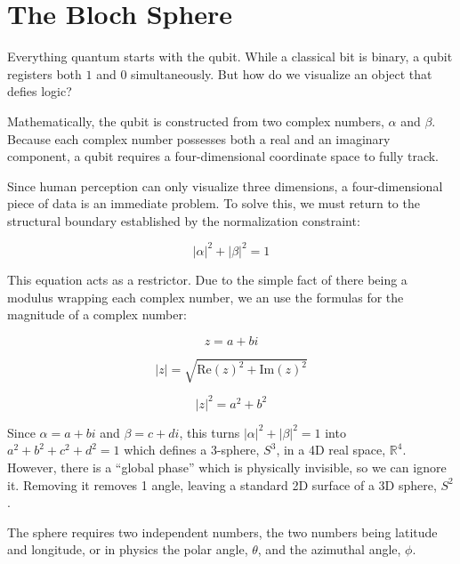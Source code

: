 \documentclass[12pt]{article}
\begin{document}
\section{The Bloch Sphere}

Everything quantum starts with the qubit. While a classical bit is binary, a qubit registers both $1$ and $0$ simultaneously. But how do we visualize an object that defies logic? 

Mathematically, the qubit is constructed from two complex numbers, $\alpha$ and $\beta$. Because each complex number possesses both a real and an imaginary component, a qubit requires a four-dimensional coordinate space to fully track. 

Since human perception can only visualize three dimensions, a four-dimensional piece of data is an immediate problem. To solve this, we must return to the structural boundary established by the normalization constraint:

\begin{equation}
|\alpha|^2 + |\beta|^2 = 1 
\end{equation}
\vspace{0.1cm}

This equation acts as a restrictor. Due to the simple fact of there being a modulus wrapping each complex number, we an use the formulas for the magnitude of a complex number:

\begin{equation}
z = a + bi
\end{equation}

\begin{equation*}
|z| = \sqrt{\text{Re}(z)^2 + \text{Im}(z)^2} 
\end{equation*}\notag

\begin{equation*}
|z|^2 = a^2 + b^2 
\end{equation*}\notag
\vspace{0.1cm}

Since $\alpha = a + bi$ and $\beta = c + di$, this turns $|\alpha|^2 + |\beta|^2 = 1$ into $a^2 +b^2+c^2+d^2 = 1$ which defines a 3-sphere, $S^3$, in a 4D real space, $\mathbb{R}^4$. However, there is a  ``global phase'' which is physically invisible, so we can ignore it. Removing it removes 1 angle, leaving a standard 2D surface of a 3D sphere, $S^2$.

The sphere requires two independent numbers, the two numbers being latitude and longitude, or in physics the polar angle, $\theta$, and the azimuthal angle, $\phi$. 
\end{document}
